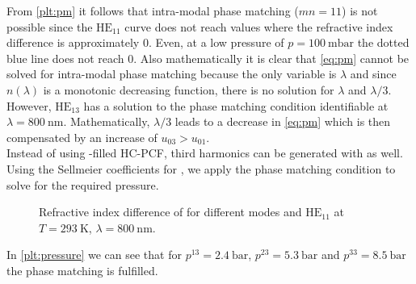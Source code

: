 \documentclass[fleqn, 10pt, twocolumn]{SelfArx}
\begin{document}
    From \autoref{plt:pm} it follows that intra-modal phase matching ($mn = 11$) is not possible since the $\text{HE}_{11}$ curve does not reach values where the refractive index difference is approximately 0.
    Even, at a low pressure of $p=\SI{100}{\milli\bar}$ the dotted blue line does not reach 0. 
    Also mathematically it is clear that \eqref{eq:pm} cannot be solved for intra-modal phase matching because the only variable is $\lambda$ and since $n(\lambda)$ is a monotonic decreasing function, there is no solution for $\lambda$ and $\lambda/3$. 
    However, $\text{HE}_{13}$ has a solution to the phase matching condition identifiable at $\lambda=\SI{800}{\nano\meter}$.
    Mathematically, $\lambda/3$ leads to a decrease in \eqref{eq:pm} which is then compensated by an increase of $u_{03}>u_{01}$.\\
    Instead of using -filled HC-PCF, third harmonics can be generated with  as well. 
    Using the Sellmeier coefficients for , we apply the phase matching condition to 
    solve for the required pressure.
    \begin{figure}[h]
        \centering
        \caption{Refractive index difference of  for different  modes and $\text{HE}_{11}$ at $T=\SI{293}{\kelvin}$,  $\lambda=\SI{800}{\nano\meter}$.}
        \label{plt:pressure}
    \end{figure}
    In \autoref{plt:pressure} we can see that for $p^{13}=\SI{2.4}{\bar}$, $p^{23}=\SI{5.3}{\bar}$ and $p^{33}=\SI{8.5}{\bar}$ the phase matching is fulfilled. 
\end{document}
